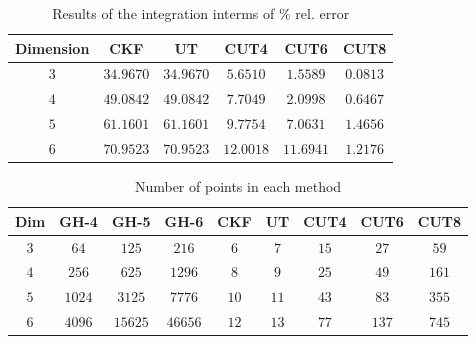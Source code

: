 \documentclass{beamer}
\begin{document}
\begin{frame}
\begin{table}
\caption{Results of the integration interms of \% rel. error }
\label{optsoln12}
\begin{center}

\begin{tabular}{|c||c|c|c|c|c|}
\hline
Dimension & CKF & UT & CUT4 & CUT6 & CUT8 \\
\hline
$3$ & $34.9670 $  &  $34.9670$ & $5.6510$ & $1.5589$ & $0.0813$  \\
\hline
$4$ & $49.0842 $  &  $49.0842 $ &  $7.7049$ &  $2.0998 $ & $0.6467$\\
\hline
$5$ & $61.1601 $  &  $61.1601 $ &  $9.7754$ & $7.0631 $ & $1.4656$\\
\hline
$6$ & $70.9523$  &  $70.9523 $ & $12.0018$ & $11.6941$ & $1.2176$\\
\hline
\end{tabular}
\end{center}
\end{table}

\begin{table}
\caption{Number of points in each method }
\label{optsoln12}
\begin{center}
\small
\begin{tabular}{|c||c|c|c|c|c|c|c|c|}
\hline
Dim    &  GH-4  & GH-5     &  GH-6         & CKF   & UT    & CUT4  & CUT6  & CUT8 \\
\hline
$3$    & $64$  & $125 $   &  $216$    &      $6$   & $7$   & $15$   & $27$   & $59$\\
\hline
$4$    & $256$  & $625 $  &  $1296$   &   $8$   & $9$   & $25$   & $49$   & $161$\\
\hline
$5$   &  $1024$  & $3125 $  &  $7776 $ &   $10$  & $11$  & $43$   & $83$   & $355$\\
\hline
$6$    & $4096$  & $15625$   &  $46656$  &   $12$  & $13$  & $77$   & $137$   & $745$\\
\hline
\end{tabular}
\end{center}
\end{table}
\end{frame}
\end{document}
